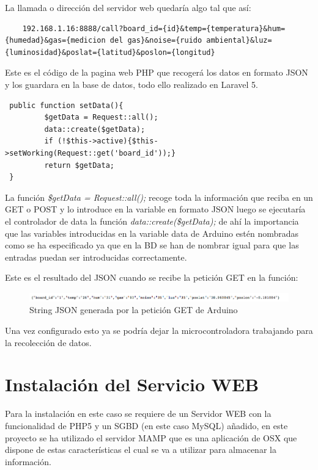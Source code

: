 La llamada o dirección del servidor web quedaría algo tal que así: 

\begin{lstlisting}
	192.168.1.16:8888/call?board_id={id}&temp={temperatura}&hum={humedad}&gas={medicion del gas}&noise={ruido ambiental}&luz={luminosidad}&poslat={latitud}&poslon={longitud}
\end{lstlisting}

Este es el código de la pagina web PHP que recogerá los datos en formato JSON y los guardara en la base de datos, todo ello realizado en Laravel 5.

\begin{lstlisting}
 public function setData(){
		 $getData = Request::all();
		 data::create($getData);
		 if (!$this->active){$this->setWorking(Request::get('board_id'));}
		 return $getData;
 }
\end{lstlisting}

La función \textit{\$getData = Request::all();} recoge toda la información que reciba en un GET o POST y lo introduce en la variable en formato JSON luego se ejecutaría el controlador de data la función \textit{data::create(\$getData);} de ahí la importancia que las variables introducidas en la variable data de Arduino estén nombradas como se ha especificado ya que en la BD se han de nombrar igual para que las entradas puedan ser introducidas correctamente.

Este es el resultado del JSON cuando se recibe la petición GET en la función:

\begin{figure}[!h]
	\centering
	\includegraphics[width=1.0\linewidth]{figuras/jsonstring}
	\caption{String JSON generada por la petición GET de Arduino}
	\label{fig:montfin}
\end{figure}

Una vez configurado esto ya se podría dejar la microcontroladora trabajando para la recolección de datos.

\section{Instalación del Servicio WEB}

Para la instalación en este caso se requiere de un Servidor WEB con la funcionalidad de PHP5 y un SGBD (en este caso MySQL) añadido, en este proyecto se ha utilizado el servidor MAMP que es una aplicación de OSX que dispone de estas características el cual se va a utilizar para almacenar la información.

